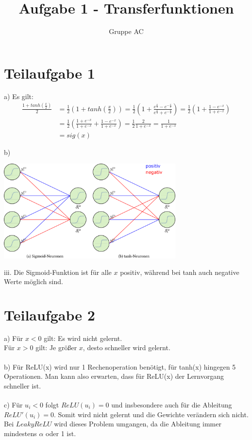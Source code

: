 \documentclass[a4paper, 11pt]{article}
\title{\textbf{Aufgabe 1 - Transferfunktionen}}
\author{Gruppe AC}
\begin{document}
\maketitle

\section*{Teilaufgabe 1}

a) Es gilt:
\begin{align*}
	\frac{1 + tanh(\frac{x}{2})}{2} &= \frac{1}{2} \left(1 + tanh(\frac{x}{2})\right) = \frac{1}{2} \left(1 + \frac{e^{\frac{x}{2}} - e^{-\frac{x}{2}}}{e^{\frac{x}{2}} + e^{-\frac{x}{2}}} \right) = \frac{1}{2} \left(1 + \frac{1 - e^{-x}}{1 + e^{-x}} \right) \\ &= \frac{1}{2} \left( \frac{1 + e^{-x}}{1 + e^{-x}} + \frac{1 - e^{-x}}{1 + e^{-x}} \right)  = \frac{1}{2} \frac{2}{1 + e^{-x}}  = \frac{1}{1 + e^{-x}} \\ &= sig(x)
\end{align*}

b)\\
\begin{center}\includegraphics[width = 0.7\textwidth]{1b}\\\end{center}

iii. Die Sigmoid-Funktion ist für alle $x$ positiv, während bei tanh auch negative Werte möglich sind.

\section*{Teilaufgabe 2}

a) Für $x < 0$ gilt: Es wird nicht gelernt.\\
Für $x > 0$ gilt: Je größer $x$, desto schneller wird gelernt.\\
\\
b) Für ReLU(x) wird nur 1 Rechenoperation benötigt, für tanh(x) hingegen 5 Operationen. Man kann also erwarten, dass für ReLU(x) der Lernvorgang schneller ist.\\
\\
c) Für $u_i < 0$ folgt $ReLU(u_i) = 0$ und insbesondere auch für die Ableitung $ReLU'(u_i) = 0$. Somit wird nicht gelernt und die Gewichte verändern sich nicht. Bei $LeakyReLU$ wird dieses Problem umgangen, da die Ableitung immer mindestens $\alpha$ oder 1 ist.
\end{document}
